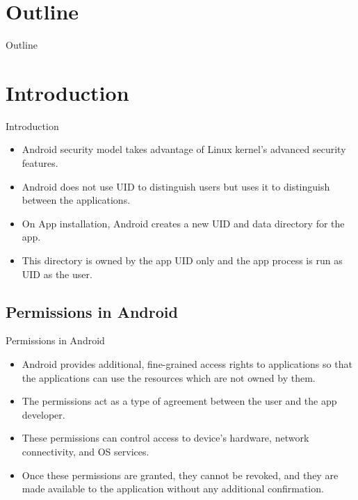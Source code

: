 \documentclass{beamer}
\begin{document}
\section*{Outline}
\begin{frame}[label=outline,noframenumbering,plain]{Outline}
    \tableofcontents
\end{frame}

\section{Introduction}
\begin{frame}[allowframebreaks]{Introduction}
    \begin{itemize}
        \item Android security model takes advantage of Linux kernel's advanced security features.
        \item Android does not use UID to distinguish users but uses it to distinguish between the applications.
        \item On App installation, Android creates a new UID and data directory for the app.
        \item This directory is owned by the app UID only and the app process is run as UID as the user. 
    \end{itemize}
\end{frame}

\subsection{Permissions in Android}
\begin{frame}[allowframebreaks]{Permissions in Android}
    \begin{itemize}
        \item Android provides additional, fine-grained access rights to applications so that the applications can use the resources which are not owned by them.
        \item The permissions act as a type of agreement between the user and the app developer.
        \item These permissions can control access to device's hardware, network connectivity, and OS services.
        \item Once these permissions are granted, they cannot be revoked, and they are made available to the application without any additional confirmation.
    \end{itemize}
\end{frame}
\end{document}
